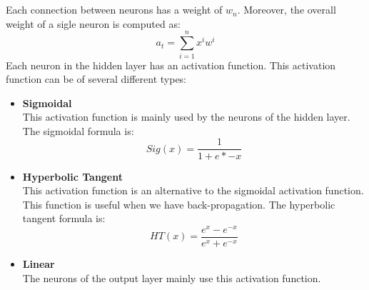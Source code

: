 \documentclass{article}
\begin{document}
 \\ \\
Each connection between neurons has a weight of $w_n$. Moreover, the overall weight of a sigle neuron is computed as:
\[ a_t = \sum^n_{i=1}x^i w^i \]
Each neuron in the hidden layer has an activation function. This activation function can be of several different types:

\begin{itemize}
	\item \textbf{Sigmoidal}
	\vspace{.2cm} \\
	This activation function is mainly used by the neurons of the hidden layer. The sigmoidal formula is:
	\[ Sig(x) = \frac{1}{1 + e*{-x}} \]
	
	\item \textbf{Hyperbolic Tangent}
	\vspace{.2cm} \\
	This activation function is an alternative to the sigmoidal activation function. This function is useful when we have back-propagation. The hyperbolic tangent formula is:
	\[ HT(x) = \frac{e^x-e^{-x}}{e^x+e^{-x}} \]
	
	\item \textbf{Linear}
	\vspace{.2cm} \\
	The neurons of the output layer mainly use this activation function.
\end{itemize}
\end{document}
